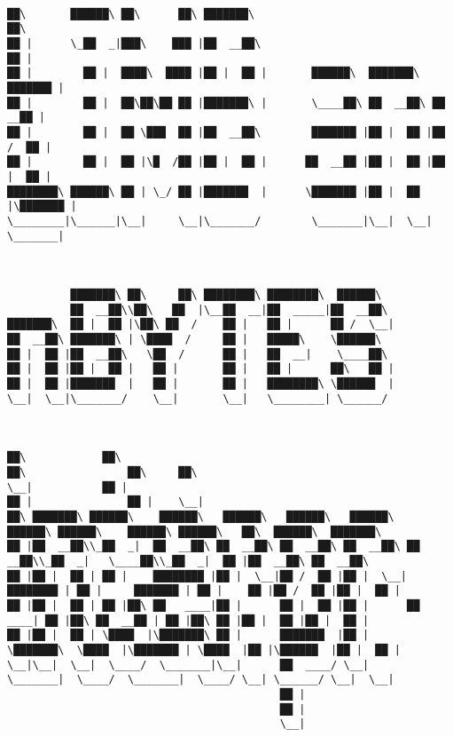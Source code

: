 \documentclass[varwidth=\maxdimen,margin=0.5cm,multi={verbatim}]{standalone}
\begin{document}
\begin{verbatim}

██\       ██████\ ██\      ██\ ███████\                                  ██\
██ |      \_██  _|███\    ███ |██  __██\                                 ██ |
██ |        ██ |  ████\  ████ |██ |  ██ |       ██████\  ███████\   ███████ |
██ |        ██ |  ██\██\██ ██ |███████\ |       \____██\ ██  __██\ ██  __██ |
██ |        ██ |  ██ \███  ██ |██  __██\        ███████ |██ |  ██ |██ /  ██ |
██ |        ██ |  ██ |\█  /██ |██ |  ██ |      ██  __██ |██ |  ██ |██ |  ██ |
████████\ ██████\ ██ | \_/ ██ |███████  |      \███████ |██ |  ██ |\███████ |
\________|\______|\__|     \__|\_______/        \_______|\__|  \__| \_______|



          ███████\ ██\     ██\ ████████\ ████████\  ██████\
          ██  __██\\██\   ██  |\__██  __|██  _____|██  __██\
███████\  ██ |  ██ |\██\ ██  /    ██ |   ██ |      ██ /  \__|
██  __██\ ███████\ | \████  /     ██ |   █████\    \██████\
██ |  ██ |██  __██\   \██  /      ██ |   ██  __|    \____██\
██ |  ██ |██ |  ██ |   ██ |       ██ |   ██ |      ██\   ██ |
██ |  ██ |███████  |   ██ |       ██ |   ████████\ \██████  |
\__|  \__|\_______/    \__|       \__|   \________| \______/



██\            ██\                                                        ██\                ██\     ██\
\__|           ██ |                                                       ██ |               ██ |    \__|
██\ ███████\ ██████\    ██████\   ██████\   ██████\   ██████\   ██████\ ██████\    ██████\ ██████\   ██\  ██████\  ███████\
██ |██  __██\\_██  _|  ██  __██\ ██  __██\ ██  __██\ ██  __██\ ██  __██\\_██  _|   \____██\\_██  _|  ██ |██  __██\ ██  __██\
██ |██ |  ██ | ██ |    ████████ |██ |  \__|██ /  ██ |██ |  \__|████████ | ██ |     ███████ | ██ |    ██ |██ /  ██ |██ |  ██ |
██ |██ |  ██ | ██ |██\ ██   ____|██ |      ██ |  ██ |██ |      ██   ____| ██ |██\ ██  __██ | ██ |██\ ██ |██ |  ██ |██ |  ██ |
██ |██ |  ██ | \████  |\███████\ ██ |      ███████  |██ |      \███████\  \████  |\███████ | \████  |██ |\██████  |██ |  ██ |
\__|\__|  \__|  \____/  \_______|\__|      ██  ____/ \__|       \_______|  \____/  \_______|  \____/ \__| \______/ \__|  \__|
                                           ██ |
                                           ██ |
                                           \__|



\end{verbatim}
\end{document}

